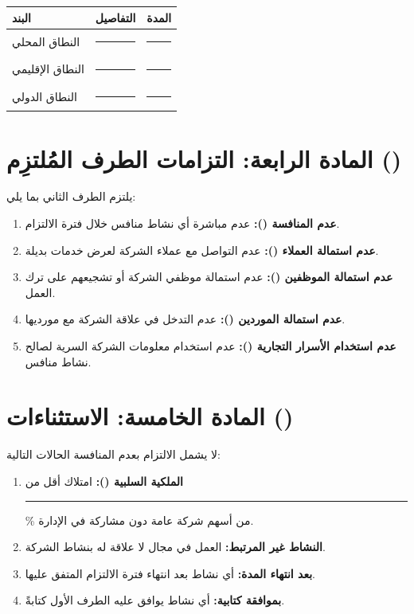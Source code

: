 \documentclass[12pt,a4paper]{article}
\begin{document}
\begin{table}[H]
\centering
\renewcommand{\arraystretch}{1.5}
\begin{tabularx}{\textwidth}{L{5cm} X L{3cm}}
\toprule
\textbf{البند} & \textbf{التفاصيل} & \textbf{المدة} \\
\midrule
النطاق المحلي & \rule{6cm}{0.4pt} & \rule{2.5cm}{0.4pt} \\
النطاق الإقليمي & \rule{6cm}{0.4pt} & \rule{2.5cm}{0.4pt} \\
النطاق الدولي & \rule{6cm}{0.4pt} & \rule{2.5cm}{0.4pt} \\
\bottomrule
\end{tabularx}
\end{table}

\section{المادة الرابعة: التزامات الطرف المُلتزِم ()}
\label{sec:obligations}
يلتزم الطرف الثاني بما يلي:
\begin{enumerate}
    \item \textbf{عدم المنافسة ():} عدم مباشرة أي نشاط منافس خلال فترة الالتزام.
    \item \textbf{عدم استمالة العملاء ():} عدم التواصل مع عملاء الشركة لعرض خدمات بديلة.
    \item \textbf{عدم استمالة الموظفين ():} عدم استمالة موظفي الشركة أو تشجيعهم على ترك العمل.
    \item \textbf{عدم استمالة الموردين ():} عدم التدخل في علاقة الشركة مع مورديها.
    \item \textbf{عدم استخدام الأسرار التجارية ():} عدم استخدام معلومات الشركة السرية لصالح نشاط منافس.
\end{enumerate}

\section{المادة الخامسة: الاستثناءات ()}
\label{sec:exceptions}
لا يشمل الالتزام بعدم المنافسة الحالات التالية:
\begin{enumerate}
    \item \textbf{الملكية السلبية ():} امتلاك أقل من \rule{2cm}{0.4pt}\% من أسهم شركة عامة دون مشاركة في الإدارة.
    \item \textbf{النشاط غير المرتبط:} العمل في مجال لا علاقة له بنشاط الشركة.
    \item \textbf{بعد انتهاء المدة:} أي نشاط بعد انتهاء فترة الالتزام المتفق عليها.
    \item \textbf{بموافقة كتابية:} أي نشاط يوافق عليه الطرف الأول كتابةً.
\end{enumerate}
\end{document}
